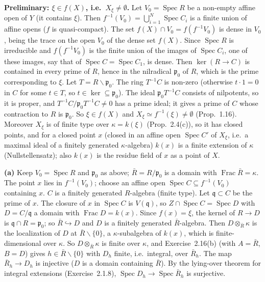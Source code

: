\documentclass[11pt]{article}
\begin{document}
\textbf{Preliminary: $\xi\in f(X)$, i.e.\ $X_\xi\neq\emptyset$.} Let $V_0=\operatorname{Spec}R$ be a non-empty affine open of $Y$ (it contains $\xi$). Then $f^{-1}(V_0)=\bigcup_{i=1}^N\operatorname{Spec}C_i$ is a finite union of affine opens ($f$ is quasi-compact). The set $f(X)\cap V_0=f(f^{-1}V_0)$ is dense in $V_0$, being the trace on the open $V_0$ of the dense set $f(X)$. Since $\operatorname{Spec}R$ is irreducible and $f(f^{-1}V_0)$ is the finite union of the images of $\operatorname{Spec}C_i$, one of these images, say that of $\operatorname{Spec}C=\operatorname{Spec}C_1$, is dense. Then $\ker(R\to C)$ is contained in every prime of $R$, hence in the nilradical $\mathfrak p_0$ of $R$, which is the prime corresponding to $\xi$. Let $T=R\smallsetminus\mathfrak p_0$. The ring $T^{-1}C$ is non-zero (otherwise $t\cdot1=0$ in $C$ for some $t\in T$, so $t\in\ker\subseteq\mathfrak p_0$). The ideal $\mathfrak p_0T^{-1}C$ consists of nilpotents, so it is proper, and $T^{-1}C/\mathfrak p_0T^{-1}C\ne0$ has a prime ideal; it gives a prime of $C$ whose contraction to $R$ is $\mathfrak p_0$. So $\xi\in f(X)$ and $X_\xi\simeq f^{-1}(\xi)\neq\emptyset$ (Prop.~1.16). Moreover $X_\xi$ is of finite type over $\kappa=k(\xi)$ (Prop.~2.4(c)), so it has closed points, and for a closed point $x$ (closed in an affine open $\operatorname{Spec}C'$ of $X_\xi$, i.e.\ a maximal ideal of a finitely generated $\kappa$-algebra) $k(x)$ is a finite extension of $\kappa$ (Nullstellensatz); also $k(x)$ is the residue field of $x$ as a point of $X$.

\textbf{(a)} Keep $V_0=\operatorname{Spec}R$ and $\mathfrak p_0$ as above; $\bar R=R/\mathfrak p_0$ is a domain with $\operatorname{Frac}\bar R=\kappa$. The point $x$ lies in $f^{-1}(V_0)$; choose an affine open $\operatorname{Spec}C\subseteq f^{-1}(V_0)$ containing $x$. $C$ is a finitely generated $R$-algebra (finite type). Let $\mathfrak q\subset C$ be the prime of $x$. The closure of $x$ in $\operatorname{Spec}C$ is $V(\mathfrak q)$, so $Z\cap\operatorname{Spec}C=\operatorname{Spec}D$ with $D=C/\mathfrak q$ a domain with $\operatorname{Frac}D=k(x)$. Since $f(x)=\xi$, the kernel of $R\to D$ is $\mathfrak q\cap R=\mathfrak p_0$; so $\bar R\hookrightarrow D$ and $D$ is a finitely generated $\bar R$-algebra. Then $D\otimes_{\bar R}\kappa$ is the localization of $D$ at $\bar R\smallsetminus\{0\}$, a $\kappa$-subalgebra of $k(x)$, which is finite-dimensional over $\kappa$. So $D\otimes_{\bar R}\kappa$ is finite over $\kappa$, and Exercise~2.16(b) (with $A=\bar R$, $B=D$) gives $h\in\bar R\smallsetminus\{0\}$ with $D_h$ finite, i.e.\ integral, over $\bar R_h$. The map $\bar R_h\to D_h$ is injective ($D$ is a domain containing $\bar R$). By the lying-over theorem for integral extensions (Exercise~2.1.8), $\operatorname{Spec}D_h\to\operatorname{Spec}\bar R_h$ is surjective.
\end{document}
